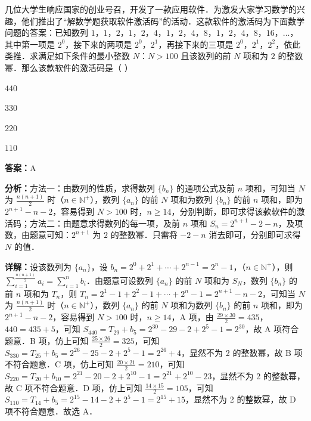 \begin{question}[points=5]
几位大学生响应国家的创业号召，开发了一款应用软件．为激发大家学习数学的兴趣，他们推出了“解数学题获取软件激活码”的活动．这款软件的激活码为下面数学问题的答案：已知数列 $1$，$1$，$2$，$1$，$2$，$4$，$1$，$2$，$4$，$8$，$1$，$2$，$4$，$8$，$16$，$\ldots$，其中第一项是 $2^0$，接下来的两项是 $2^0$，$2^1$，再接下来的三项是 $2^0$，$2^1$，$2^2$，依此类推．求满足如下条件的最小整数 $N$：$N>100$ 且该数列的前 $N$ 项和为 $2$ 的整数幂．那么该款软件的激活码是（ ）
\begin{choices}
  \item $440$
  \item $330$
  \item $220$
  \item $110$
\end{choices}
\begin{solution}
\textbf{答案：}A

\textbf{分析：}方法一：由数列的性质，求得数列 $\{b_n\}$ 的通项公式及前 $n$ 项和，可知当 $N$ 为 $\frac{n(n+1)}{2}$ 时（$n\in\mathbb{N}^+$），数列 $\{a_n\}$ 的前 $N$ 项和为数列 $\{b_n\}$ 的前 $n$ 项和，即为 $2^{n+1}-n-2$，容易得到 $N>100$ 时，$n\geq 14$，分别判断，即可求得该款软件的激活码；方法二：由题意求得数列的每一项，及前 $n$ 项和 $S_n=2^{n+1}-2-n$，及项数，由题意可知：$2^{n+1}$ 为 $2$ 的整数幂．只需将 $-2-n$ 消去即可，分别即可求得 $N$ 的值．

\textbf{详解：}设该数列为 $\{a_n\}$，设 $b_n=2^0+2^1+\cdots+2^{n-1}=2^n-1$，（$n\in\mathbb{N}^+$），则 $\sum_{i=1}^{\frac{n(n+1)}{2}} a_i = \sum_{i=1}^n b_i$．由题意可设数列 $\{a_n\}$ 的前 $N$ 项和为 $S_N$，数列 $\{b_n\}$ 的前 $n$ 项和为 $T_n$，则 $T_n=2^1-1+2^2-1+\cdots+2^n-1=2^{n+1}-n-2$，可知当 $N$ 为 $\frac{n(n+1)}{2}$ 时（$n\in\mathbb{N}^+$），数列 $\{a_n\}$ 的前 $N$ 项和为数列 $\{b_n\}$ 的前 $n$ 项和，即为 $2^{n+1}-n-2$，容易得到 $N>100$ 时，$n\geq 14$，A 项，由 $\frac{29\times30}{2}=435$，$440=435+5$，可知 $S_{440}=T_{29}+b_5=2^{30}-29-2+2^5-1=2^{30}$，故 A 项符合题意．B 项，仿上可知 $\frac{25\times26}{2}=325$，可知 $S_{330}=T_{25}+b_5=2^{26}-25-2+2^5-1=2^{26}+4$，显然不为 2 的整数幂，故 B 项不符合题意．C 项，仿上可知 $\frac{20\times21}{2}=210$，可知 $S_{220}=T_{20}+b_{10}=2^{21}-20-2+2^{10}-1=2^{21}+2^{10}-23$，显然不为 2 的整数幂，故 C 项不符合题意．D 项，仿上可知 $\frac{14\times15}{2}=105$，可知 $S_{110}=T_{14}+b_5=2^{15}-14-2+2^5-1=2^{15}+15$，显然不为 2 的整数幂，故 D 项不符合题意．故选 A．
\end{solution}
\end{question}


